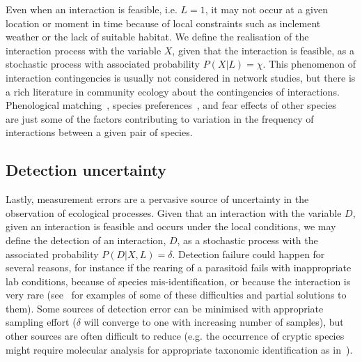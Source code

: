 \documentclass[12pt]{article}
\begin{document}
    Even when an interaction is feasible, i.e. $L=1$, it may not occur at a given location or moment in time because of local constraints such as inclement weather or the lack of suitable habitat. We define the realisation of the interaction process with the variable $X$, given that the interaction is feasible, as a stochastic process with associated probability $P(X|L)=\chi$. This phenomenon of interaction contingencies is usually not considered in network studies, but there is a rich literature in community ecology about the contingencies of interactions. Phenological matching~\citep{MillerRushing2010,Gezon2016}, species preferences~\citep{Pires2011,Novak2015,Coux2016}, and fear effects of other species~\citep{Luttbeg2005,Wirsing2007} are just some of the factors contributing to variation in the frequency of interactions between a given pair of species.

    \subsection*{Detection uncertainty} 

    Lastly, measurement errors are a pervasive source of uncertainty in the observation of ecological processes. Given that an interaction with the variable $D$, given an interaction is feasible and occurs under the local conditions, we may define the detection of an interaction, $D$, as a stochastic process with the associated probability $P(D|X,L)=\delta$. Detection failure could happen for several reasons, for instance if the rearing of a parasitoid fails with inappropriate lab conditions, because of species mis-identification, or because the interaction is very rare (see~\citet{Wirta2014} for examples of some of these difficulties and partial solutions to them). Some sources of detection error can be minimised with appropriate sampling effort ($\delta$ will converge to one with increasing number of samples), but other sources are often difficult to reduce (e.g. the occurrence of cryptic species might require molecular analysis for appropriate taxonomic identification as in~\citealt{Wirta2014,Frost2016}).
\end{document}
